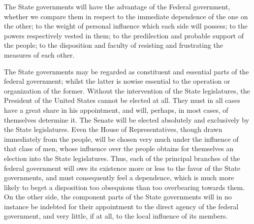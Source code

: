 The State governments will have the advantage of the Federal government, whether we compare them in respect to the immediate dependence of the one on the other; to the weight of personal influence which each side will possess; to the powers respectively vested in them; to the predilection and probable support of the people; to the disposition and faculty of resisting and frustrating the measures of each other.

The State governments may be regarded as constituent and essential parts of the federal government; whilst the latter is nowise essential to the operation or organization of the former. 
Without the intervention of the State legislatures, the President of the United States cannot be elected at all. 
They must in all cases have a great share in his appointment, and will, perhaps, in most cases, of themselves determine it. 
The Senate will be elected absolutely and exclusively by the State legislatures. 
Even the House of Representatives, though drawn immediately from the people, will be chosen very much under the influence of that class of men, whose influence over the people obtains for themselves an election into the State legislatures. 
Thus, each of the principal branches of the federal government will owe its existence more or less to the favor of the State governments, and must consequently feel a dependence, which is much more likely to beget a disposition too obsequious than too overbearing towards them. 
On the other side, the component parts of the State governments will in no instance be indebted for their appointment to the direct agency of the federal government, and very little, if at all, to the local influence of its members.

